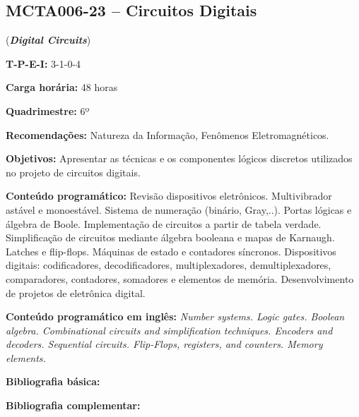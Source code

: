 \documentclass[class=article, crop=false]{standalone}
\begin{document}
\subsection*{MCTA006-23 -- Circuitos Digitais}
\label{disc:circ_dig}

(\textbf{\textit{Digital Circuits}})

\begin{center}
    \begin{minipage}{0.85\textwidth}
        \textbf{T-P-E-I:} 3-1-0-4
        
        \textbf{Carga horária:} 48 horas
        
        \textbf{Quadrimestre:} 6º
        
        \textbf{Recomendações:} 
        Natureza da Informação, 
        Fenômenos Eletromagnéticos.
    \end{minipage}
\end{center}

\textbf{Objetivos:}
Apresentar as técnicas e os componentes lógicos discretos utilizados no projeto
de circuitos digitais.

\textbf{Conteúdo programático:}
Revisão dispositivos eletrônicos. 
Multivibrador astável e monoestável. 
Sistema de numeração (binário, Gray,..). 
Portas lógicas e álgebra de Boole. 
Implementação de circuitos a partir de tabela verdade. 
Simplificação de circuitos mediante álgebra booleana e mapas de Karnaugh. 
Latches e flip-flops. 
Máquinas de estado e contadores síncronos. 
Dispositivos digitais: codificadores, decodificadores, multiplexadores,
demultiplexadores, comparadores, contadores, somadores e elementos de memória.
Desenvolvimento de projetos de eletrônica digital.

\textbf{Conteúdo programático em inglês:}
\textit{Number systems. 
Logic gates. 
Boolean algebra. 
Combinational circuits and simplification techniques. 
Encoders and decoders. 
Sequential circuits. 
Flip-Flops, registers, and counters. 
Memory elements.}

\newrefsection
\textbf{Bibliografia básica:}
\nocite{2007-floyd, 2007-tocci, 2008-vahid}
\printbibliography

\newrefsection
\textbf{Bibliografia complementar:}
\nocite{2000-ercegovac, 2006-idoeta, 2005-katz, 2006-wakerly, 2005-agarwal}
\printbibliography
\end{document}
